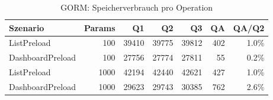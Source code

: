 \begin{table}[ht]
\centering
\caption{GORM: Speicherverbrauch pro Operation}
\begin{tabular}{lrrrrrr}
\toprule
Szenario & Params & Q1 & Q2 & Q3 & QA & QA/Q2 \\
\midrule
		ListPreload & 100 & 39410 & 39775 & 39812 & 402 & 1.0\% \\
		DashboardPreload & 100 & 27756 & 27774 & 27811 & 55 & 0.2\% \\
		ListPreload & 1000 & 42194 & 42440 & 42621 & 427 & 1.0\% \\
		DashboardPreload & 1000 & 29623 & 29743 & 30385 & 762 & 2.6\% \\
\bottomrule
\end{tabular}
\label{tab:benchmark_gorm_bytesperop}
\end{table}
	